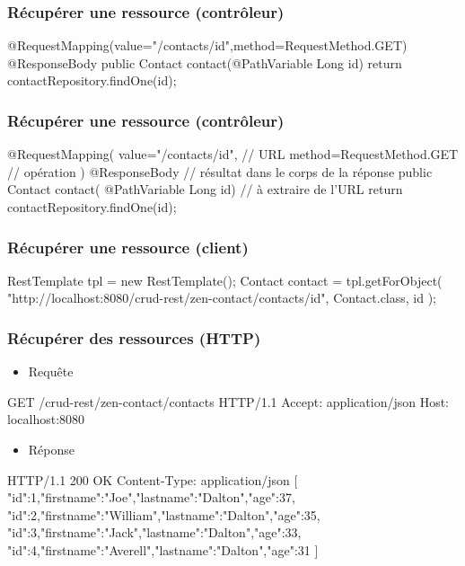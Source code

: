 \begin{frame}[fragile]
 \frametitle{Récupérer une ressource (contrôleur)}
 
 \begin{javacode}
@RequestMapping(value="/contacts/{id}",method=RequestMethod.GET)   
@ResponseBody                 
public Contact contact(@PathVariable Long id) {  
  return contactRepository.findOne(id);
}
 \end{javacode}  

\end{frame}

\begin{frame}[fragile]
 \frametitle{Récupérer une ressource (contrôleur)}
 
 \begin{javacode}
@RequestMapping(
  value="/contacts/{id}",     // URL
  method=RequestMethod.GET    // op\'eration
)
@ResponseBody                 // r\'esultat dans le corps de la r\'eponse
public Contact contact(
    @PathVariable Long id) {  // \`a extraire de l'URL
  return contactRepository.findOne(id);
}
 \end{javacode}  

\end{frame}

\begin{frame}[fragile]
 \frametitle{Récupérer une ressource (client)}
 
 \begin{javacode}
RestTemplate tpl = new RestTemplate();
Contact contact = tpl.getForObject(
  "http://localhost:8080/crud-rest/zen-contact/contacts/{id}", 
  Contact.class,
  id
);
 \end{javacode}  

\end{frame}

\begin{frame}[fragile]
 \frametitle{Récupérer des ressources (HTTP)}
 
 \begin{itemize}
  \item Requête
 \end{itemize} 
 
 \begin{textcode}
GET /crud-rest/zen-contact/contacts HTTP/1.1
Accept: application/json
Host: localhost:8080
 \end{textcode}
 
  \begin{itemize}
  \item Réponse
 \end{itemize} 
 
 \begin{textcode}
HTTP/1.1 200 OK
Content-Type: application/json
[
 {"id":1,"firstname":"Joe","lastname":"Dalton","age":37},
 {"id":2,"firstname":"William","lastname":"Dalton","age":35},
 {"id":3,"firstname":"Jack","lastname":"Dalton","age":33},
 {"id":4,"firstname":"Averell","lastname":"Dalton","age":31}
]
 \end{textcode}

\end{frame}

